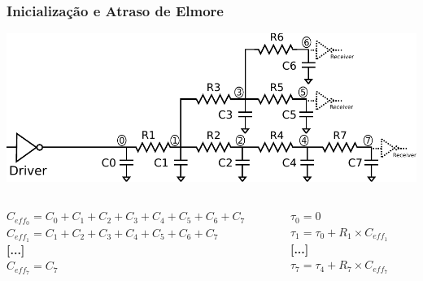 \documentclass[10pt,a4paper]{beamer}
\begin{document}
		\begin{frame}[t]
			\frametitle{Inicialização e Atraso de Elmore}
			\vspace{-0.25cm}
			\begin{center}
				\includegraphics[width=0.8\linewidth]{img/inicializacao1.pdf}
			\end{center}
			\vspace{0.4cm}
			\begin{columns}

				\begin{column}{0.7\linewidth}
					$C_{eff_0} = C_0 + C_1 + C_2 + C_3 + C_4 + C_5 + C_6 + C_7$ \\
					$C_{eff_1} = C_1 + C_2 + C_3 + C_4 + C_5 + C_6 + C_7$ \\
					\textbf{[...]}\\
					$C_{eff_7} = C_7$
				\end{column}
				\begin{column}{0.3\linewidth}
					$\tau_0 = 0$  \\
					$\tau_1 = \tau_0 + R_1 \times C_{eff_1}$ \\
					\textbf{[...]}\\
					$\tau_7 = \tau_4 + R_7 \times C_{eff_7}$ 
				\end{column}
			\end{columns}
		\end{frame}
\end{document}
